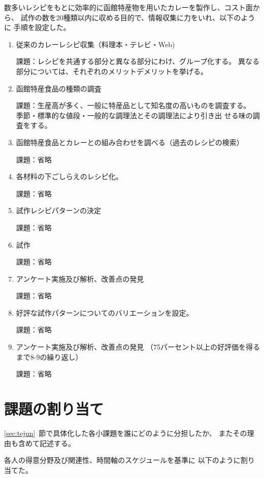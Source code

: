 \documentclass[openany,11pt,papersize]{jsbook}
\begin{document}
数多いレシピをもとに効率的に函館特産物を用いたカレーを製作し、コスト面から、 
試作の数を20種類以内に収める目的で、情報収集に力をいれ、以下のように 
手順を設定した。

\begin{enumerate}
\item 従来のカレーレシピ収集（料理本・テレビ・Web)
\par 課題：レシピを共通する部分と異なる部分にわけ、グループ化する。
     異なる部分については、それぞれのメリットデメリットを挙げる。　　

\item 函館特産食品の種類の調査
\par 課題：生産高が多く、一般に特産品として知名度の高いものを調査する。
           季節・標準的な値段・一般的な調理法とその調理法により引き出
           せる味の調査をする。　　
 　 
\item 函館特産食品とカレーとの組み合わせを調べる（過去のレシピの検索）
\par 課題：省略
 　　　 
\item 各材料の下ごしらえのレシピ化。
\par 課題：省略
 　　　 
\item 試作レシピパターンの決定
\par 課題：省略
 　　　 
\item 試作
\par 課題：省略
 　　　 
\item アンケート実施及び解析、改善点の発見
\par 課題：省略

\item 好評な試作パターンについてのバリエーションを設定。　　　
\par 課題：省略
 　　　 
\item アンケート実施及び解析、改善点の発見
（75パーセント以上の好評価を得るまで8-9の繰り返し）
\par 課題：省略
\end{enumerate}


\section{課題の割り当て}
\begin{hissu}
\ref{sec:tejun}~節で具体化した各小課題を誰にどのように分担したか、
またその理由も含めて記述する。
\end{hissu}

各人の得意分野及び関連性、時間軸のスケジュールを基準に
以下のように割り当てた。
\end{document}
